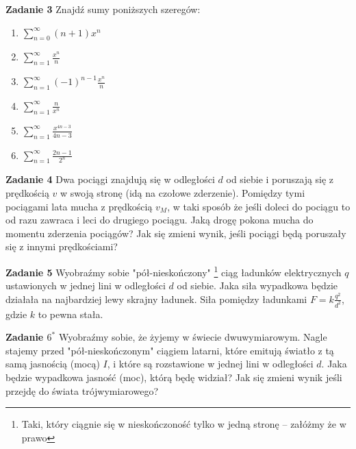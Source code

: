 \documentclass[a4paper,11pt]{article}
\begin{document}
\bigskip

\textbf{Zadanie 3} Znajdź sumy poniższych szeregów:

\begin{multicols}{3}
    \begin{enumerate}
        \item $\sum_{n=0}^\infty (n+1) x^n$
        \item $\sum_{n=1}^\infty \frac{x^n}{n}$
        \item $\sum_{n=1}^\infty (-1)^{n-1}\frac{x^n}{n}$
        \item $\sum_{n=1}^\infty \frac{n}{x^n}$
        \item $\sum_{n=1}^\infty \frac{x^{4n-3}}{4n-3}$
        \item $\sum_{n=1}^\infty \frac{2n-1}{2^n}$
    \end{enumerate}
\end{multicols}

\hrulefill

\textbf{Zadanie 4} Dwa pociągi znajdują się w odległości $d$ od siebie i poruszają się
z prędkością $v$ w swoją stronę (idą na czołowe zderzenie). Pomiędzy tymi pociągami 
lata mucha z prędkością $v_M$, w taki sposób że jeśli doleci do pociągu to od razu 
zawraca i leci do drugiego pociągu. Jaką drogę pokona mucha do momentu zderzenia 
pociągów? Jak się zmieni wynik, jeśli pociągi będą poruszały się z innymi prędkościami?

\bigskip

\textbf{Zadanie 5} Wyobraźmy sobie "pół-nieskończony" 
\footnote{Taki, który ciągnie się w nieskończoność tylko w jedną stronę -- załóżmy że w prawo} 
ciąg ładunków elektrycznych $q$
ustawionych w jednej lini w odległości $d$ od siebie. Jaka siła wypadkowa będzie 
działała na najbardziej lewy skrajny ładunek. Siła pomiędzy ładunkami 
$F = k \frac{q^2}{d^2}$, gdzie $k$ to pewna stała.

\bigskip

\textbf{Zadanie $6^\ast$} Wyobraźmy sobie, że żyjemy w świecie dwuwymiarowym. Nagle 
stajemy przed "pół-nieskończonym" ciągiem latarni, które emitują światło z tą samą 
jasnością (mocą) $I$, i które są rozstawione w jednej lini w odległości $d$. 
Jaka będzie 
wypadkowa jasność (moc), którą będę widział? Jak się zmieni wynik jeśli przejdę do 
świata trójwymiarowego?
\end{document}
